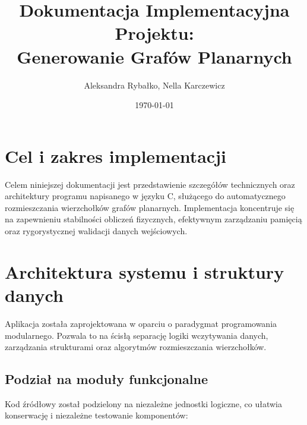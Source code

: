 \documentclass[12pt,a4paper]{article}
\title{Dokumentacja Implementacyjna Projektu: \\ Generowanie Grafów Planarnych}
\author{Aleksandra Rybałko, Nella Karczewicz}
\date{\today}
\begin{document}
\maketitle

\tableofcontents
\newpage




\section{Cel i zakres implementacji}
Celem niniejszej dokumentacji jest przedstawienie szczegółów technicznych oraz architektury programu napisanego w języku C, służącego do automatycznego rozmieszczania wierzchołków grafów planarnych. Implementacja koncentruje się na zapewnieniu stabilności obliczeń fizycznych, efektywnym zarządzaniu pamięcią oraz rygorystycznej walidacji danych wejściowych.

\section{Architektura systemu i struktury danych}

Aplikacja została zaprojektowana w oparciu o paradygmat programowania modularnego. Pozwala to na ścisłą separację logiki wczytywania danych, zarządzania strukturami oraz algorytmów rozmieszczania wierzchołków.

\subsection{Podział na moduły funkcjonalne}
Kod źródłowy został podzielony na niezależne jednostki logiczne, co ułatwia konserwację i niezależne testowanie komponentów:
\end{document}
